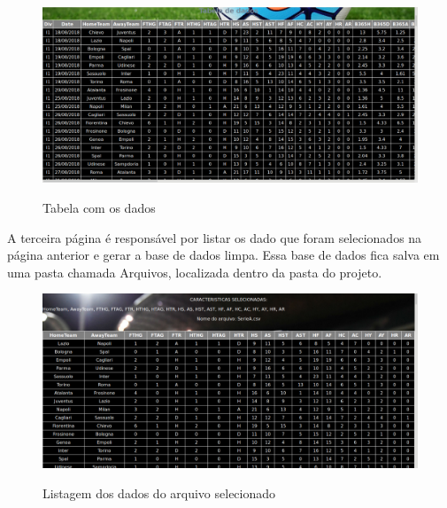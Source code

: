 \begin{figure}[htbp]
	\begin{center}
		\includegraphics[width=.9\linewidth]{imagens/listagem2.png}\\
	\end{center}
	\caption[Tabela com os dados]{Tabela com os dados}
	\label{fig:logo}
\end{figure}

\newpage

A terceira página é responsável por listar os dado que foram selecionados na página anterior e gerar a base de dados limpa. Essa base de dados fica salva em uma pasta chamada Arquivos, localizada dentro da pasta do projeto.
\begin{figure}[htbp]
	\begin{center}
		\includegraphics[width=.9\linewidth]{imagens/dados.png}\\
	\end{center}
	\caption[Listagem dos dados do arquivo selecionado]{Listagem dos dados do arquivo selecionado}
	\label{fig:logo}
\end{figure}
